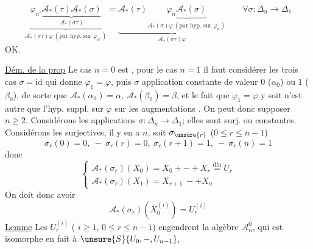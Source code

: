 \[
\underbrace{\varphi_{n'}\underbrace{\mathcal A_*(\tau)\mathcal A_*(\sigma)}_{\mathcal A_*(\sigma\tau)}}_{\mathcal A_*(\sigma\tau)\varphi\ (\text{par hyp. sur }\varphi_{n'})}
=
\underbrace{\mathcal A_*(\tau)\underbrace{\varphi_n\mathcal A_*(\sigma)}_{\mathcal A_*(\sigma)\varphi\ (\text{par hyp. sur }\varphi_n)}}_{\mathcal A_*(\sigma\tau)\varphi}
\qquad\forall\sigma:\Delta_n\to\Delta_1
\]
OK.

\uline{Dém. de la prop} Le cas $n=0$ est , pour le cas $n=1$ il faut considérer les trois cas $\sigma=\mathrm{id}$ qui donne $\varphi_1=\varphi$, puis $\sigma$ application constante de valeur $0$ ($\alpha_0$) ou $1$ ($\beta_0$), de sorte que $\mathcal A_*(\alpha_0)=\alpha$, $\mathcal A_*(\beta_0)=\beta$, et le fait que $\varphi_1=\varphi$ y soit  n'est autre que l'hyp. suppl. sur $\varphi$ sur les augmentations \inserted{$\alpha,\beta$}. On peut donc supposer $n\ge2$. Considérons les applications  $\sigma:\Delta_n\to\Delta_1$; elles sont surj. ou constantes. Considérons les surjectives, il y en a $n$, soit $\sigma_{\unsure{r}}$ ($0\le r\le n-1$)
\[
\sigma_r(0)=0,\ -\ \sigma_r(r)=0,\ \sigma_r(r+1)=1,\ -\ \sigma_r(n)=1
\]
donc 
\[
\begin{cases}
\mathcal A_*(\sigma_r)(X_0)=X_0+-+X_r\overset{\mathrm{dfn}}=U_r\\
\mathcal A_*(\sigma_r)(X_1)=X_{r+1}\ -+X_n
\end{cases}
\]
On doit donc avoir
\[
\mathcal A_*(\sigma_r)(X_0^{(i)})=U_r^{(i)}
\]
\uline{Lemme} Les $U_r^{(i)}$ ( $i\ge1$, $0\le r\le n-1$) engendrent la algèbre $\mathcal A_n^0$, qui est isomorphe en fait à $\unsure{S}\{U_0,-,U_{n-1}\}$,
